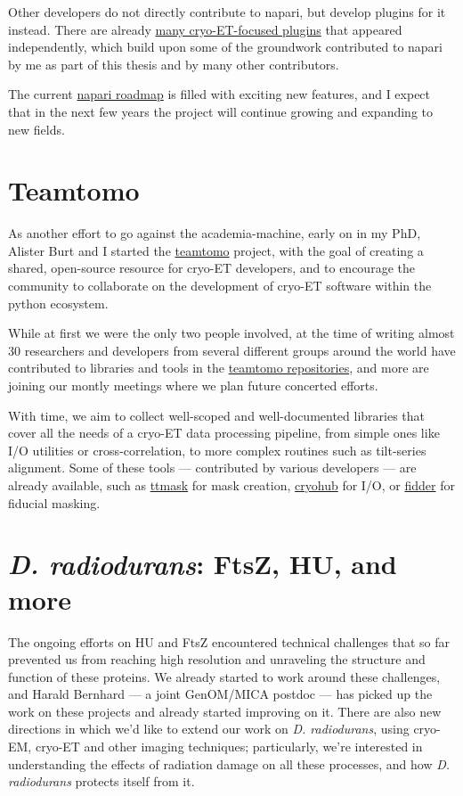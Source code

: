 Other developers do not directly contribute to napari, but develop plugins for it instead.
There are already \href{https://www.napari-hub.org/plugins?search=cryo+ET&sort=relevance&page=1}{many cryo-ET-focused plugins} that appeared independently, which build upon some of the groundwork contributed to napari by me as part of this thesis and by many other contributors.

The current \href{https://github.com/orgs/napari/projects/24/views/2?pane=info}{napari roadmap} is filled with exciting new features, and I expect that in the next few years the project will continue growing and expanding to new fields.


\section{Teamtomo}\label{teamtomo}

As another effort to go against the academia-machine, early on in my PhD, Alister Burt and I started the \href{https://teamtomo.org}{teamtomo} project, with the goal of creating a shared, open-source resource for cryo-ET developers, and to encourage the community to collaborate on the development of cryo-ET software within the python ecosystem.

While at first we were the only two people involved, at the time of writing almost 30 researchers and developers from several different groups around the world have contributed to libraries and tools in the \href{https://github.com/teamtomo}{teamtomo repositories}, and more are joining our montly meetings where we plan future concerted efforts.

With time, we aim to collect well-scoped and well-documented libraries that cover all the needs of a cryo-ET data processing pipeline, from simple ones like I/O utilities or cross-correlation, to more complex routines such as tilt-series alignment.
Some of these tools --- contributed by various developers --- are already available, such as \href{https://github.com/teamtomo/ttmask}{ttmask} for mask creation, \href{https://github.com/teamtomo/cryohub}{cryohub} for I/O, or \href{https://github.com/teamtomo/fidder}{fidder} for fiducial masking.


\section{\textit{D. radiodurans}: FtsZ, HU, and more}

The ongoing efforts on HU and FtsZ encountered technical challenges that so far prevented us from reaching high resolution and unraveling the structure and function of these proteins.
We already started to work around these challenges, and Harald Bernhard --- a joint GenOM/MICA postdoc --- has picked up the work on these projects and already started improving on it.
There are also new directions in which we'd like to extend our work on \textit{D. radiodurans}, using cryo-EM, cryo-ET and other imaging techniques; particularly, we're interested in understanding the effects of radiation damage on all these processes, and how \textit{D. radiodurans} protects itself from it.

